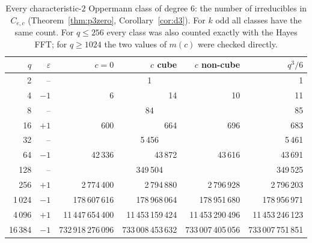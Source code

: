\begin{table}[tbp]
\centering
\caption{Every characteristic-$2$ Oppermann class of degree $6$: the number of irreducibles in $C_{e,c}$ (Theorem~\ref{thm:p3zero}, Corollary~\ref{cor:d3}). For $k$ odd all classes have the same count. For $q\le256$ every class was also counted exactly with the Hayes FFT; for $q\ge1024$ the two values of $m(c)$ were checked directly.}\label{tab:d3}
\begin{tabular}{rrrrrr}
\toprule
$q$ & $\varepsilon$ & $c=0$ & $c$ cube & $c$ non-cube & $q^3/6$\\
\midrule
2 & -- & \multicolumn{3}{c}{1} & 1\\
4 & $-1$ & 6 & 14 & 10 & 11\\
8 & -- & \multicolumn{3}{c}{84} & 85\\
16 & $+1$ & 600 & 664 & 696 & 683\\
32 & -- & \multicolumn{3}{c}{5\,456} & 5\,461\\
64 & $-1$ & 42\,336 & 43\,872 & 43\,616 & 43\,691\\
128 & -- & \multicolumn{3}{c}{349\,504} & 349\,525\\
256 & $+1$ & 2\,774\,400 & 2\,794\,880 & 2\,796\,928 & 2\,796\,203\\
1\,024 & $-1$ & 178\,607\,616 & 178\,968\,064 & 178\,951\,680 & 178\,956\,971\\
4\,096 & $+1$ & 11\,447\,654\,400 & 11\,453\,159\,424 & 11\,453\,290\,496 & 11\,453\,246\,123\\
16\,384 & $-1$ & 732\,918\,276\,096 & 733\,008\,453\,632 & 733\,007\,405\,056 & 733\,007\,751\,851\\
\bottomrule
\end{tabular}
\end{table}
